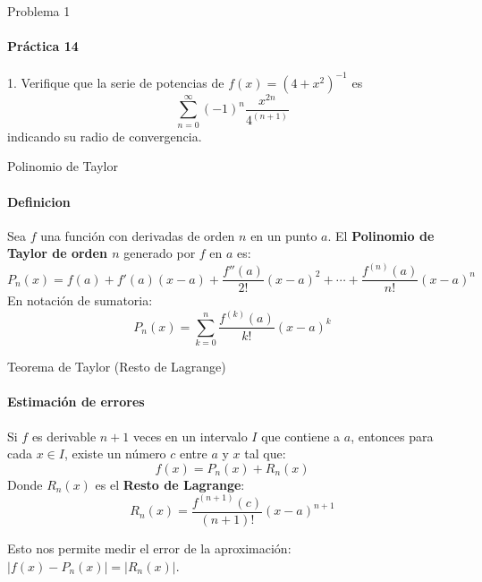 \documentclass{plantillaPPt}
\begin{document}
\primeraDiapo

\begin{frame}{Problema 1}
    \framesubtitle{Práctica 14}
    1. Verifique que la serie de potencias de $f(x)=(4+x^2)^{-1}$ es
    \begin{equation*}
        \sum_{n=0}^\infty (-1)^n\frac{x^{2n}}{4^{(n+1)}}
    \end{equation*}
    indicando su radio de convergencia.
\end{frame}

\begin{frame}{Polinomio de Taylor}
\framesubtitle{Definicion}

\begin{definicion}
    Sea \(f\) una función con derivadas de orden \(n\) en un punto \(a\). El \textbf{Polinomio de Taylor de orden \(n\)} generado por \(f\) en \(a\) es:
    \[
    P_n(x) = f(a) + f'(a)(x-a) + \frac{f''(a)}{2!}(x-a)^2 + \cdots + \frac{f^{(n)}(a)}{n!}(x-a)^n
    \]
    En notación de sumatoria:
    \[ P_n(x) = \sum_{k=0}^n \frac{f^{(k)}(a)}{k!} (x-a)^k \]
\end{definicion}

\end{frame}

\begin{frame}{Teorema de Taylor (Resto de Lagrange)}
\framesubtitle{Estimación de errores}

\begin{teorema}
    Si \(f\) es derivable \(n+1\) veces en un intervalo \(I\) que contiene a \(a\), entonces para cada \(x \in I\), existe un número \(c\) entre \(a\) y \(x\) tal que:
    \[ f(x) = P_n(x) + R_n(x) \]
    Donde \(R_n(x)\) es el \textbf{Resto de Lagrange}:
    \[ R_n(x) = \frac{f^{(n+1)}(c)}{(n+1)!}(x-a)^{n+1} \]
\end{teorema}
\vspace{-10pt}
Esto nos permite medir el error de la aproximación: \(|f(x)-P_n(x)| = |R_n(x)|\).

\end{frame}
\end{document}
